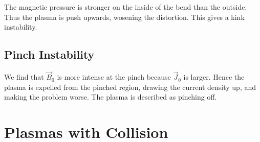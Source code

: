 \documentclass{book}         		                %
\begin{document}


The magnetic pressure is stronger on the inside of the bend than the
outside. Thus the plasma is push upwards, wosening the distortion. This gives a kink instability.

\subsection{Pinch Instability}
\label{sec:pinch}



\begin{center}
  
\end{center}
We find that $\vec{B}_0$ is more intense at the pinch because
$\vec{J}_0$ is larger. Hence the plasma is expelled from the pinched
region, drawing the current density up, and making the problem
worse. The plasma is described as pinching off.

\section{Plasmas with Collision}
\label{sec:plasm-with-coll}
\end{document}
